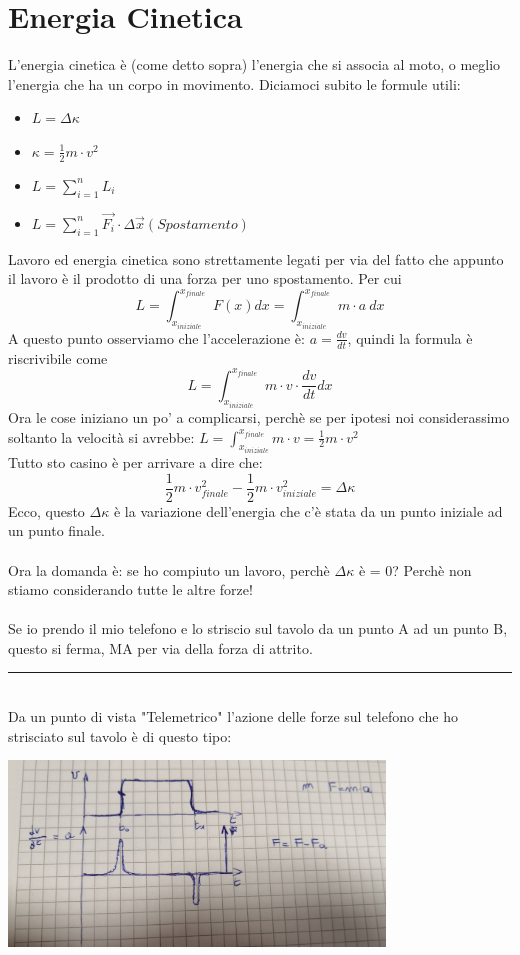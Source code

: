 \documentclass[12pt, a4paper, openany, oneside]{book}
\begin{document}
\section{Energia Cinetica}
L'energia cinetica è (come detto sopra) l'energia che si associa al moto, o 
meglio l'energia che ha un corpo in movimento. Diciamoci subito le formule utili:
\begin{itemize}
	\item $L = \Delta \kappa$
	\item $\kappa = \frac{1}{2}m\cdot v^{2}$
	\item $L = \sum_{i=1}^{n} L_{i}$
	\item $L = \sum_{i=1}^{n} \overrightarrow{F_{i}} \cdot \Delta
	\overrightarrow{x} (Spostamento)$
\end{itemize}
Lavoro ed energia cinetica sono strettamente legati per via del fatto che 
appunto il lavoro è il prodotto di una forza per uno spostamento. Per cui \\
\[
L = \int_{x_{iniziale}}^{x_{finale}} F(x) dx = 
\int_{x_{iniziale}}^{x_{finale}} m\cdot a ~ dx
\]
A questo punto osserviamo che l'accelerazione è: $a = \frac{dv}{dt}$, quindi 
la formula è riscrivibile come \[L = \int_{x_{iniziale}}^{x_{finale}} m\cdot v 
\cdot \frac{dv}{dt} dx\] 
Ora le cose iniziano un po' a complicarsi, perchè se per ipotesi noi considerassimo
soltanto la velocità si avrebbe: $L = \int_{x_{iniziale}}^{x_{finale}} m\cdot v 
= \frac{1}{2}m\cdot v^{2}$\\
Tutto sto casino è per arrivare a dire che: 
\[\frac{1}{2}m\cdot v_{finale}^{2} - \frac{1}{2}m\cdot v_{iniziale}^{2} = 
\Delta\kappa\]
Ecco, questo $\Delta\kappa$ è la variazione dell'energia che c'è stata da un 
punto iniziale ad un punto finale. \\ \\
Ora la domanda è: se ho compiuto un lavoro, perchè $\Delta\kappa$ è = 0? Perchè
non stiamo considerando tutte le altre forze! \\
\\Se io prendo il mio telefono e lo
striscio sul tavolo da un punto A ad un punto B, questo si ferma, MA per via
della forza di attrito. 
\\
{\color{black} \rule{\linewidth}{0.3mm}}
\\
Da un punto di vista "Telemetrico" l'azione delle forze sul telefono che ho 
strisciato sul tavolo è di questo tipo:
\begin{center}
\includegraphics[width=0.75\textwidth]{telefonoStriscia}
\end{center}
\end{document}

